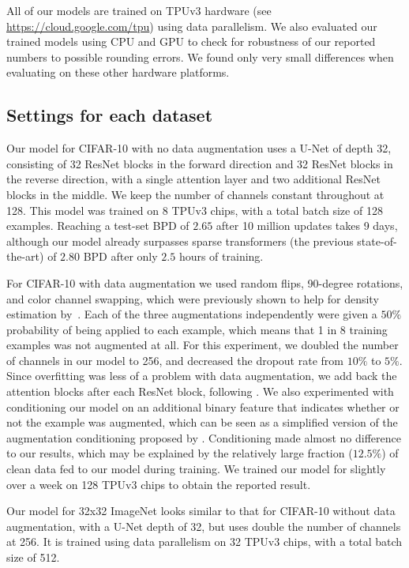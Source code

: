 \documentclass{article}
\begin{document}
All of our models are trained on TPUv3 hardware (see \url{https://cloud.google.com/tpu}) using data parallelism. We also evaluated our trained models using CPU and GPU to check for robustness of our reported numbers to possible rounding errors. We found only very small differences when evaluating on these other hardware platforms.

\subsection{Settings for each dataset}
\label{app:exp_settings}
Our model for CIFAR-10 with no data augmentation uses a U-Net of depth 32, consisting of 32 ResNet blocks in the forward direction and 32 ResNet blocks in the reverse direction, with a single attention layer and two additional ResNet blocks in the middle. We keep the number of channels constant throughout at 128. This model was trained on 8 TPUv3 chips, with a total batch size of 128 examples. Reaching a test-set BPD of $2.65$ after 10 million updates takes 9 days, although our model already surpasses sparse transformers (the previous state-of-the-art) of $2.80$ BPD after only $2.5$ hours of training.

For CIFAR-10 with data augmentation we used random flips, 90-degree rotations, and color channel swapping, which were previously shown to help for density estimation by~\cite{jun2020distribution}. Each of the three augmentations independently were given a $50\%$ probability of being applied to each example, which means that 1 in 8 training examples was not augmented at all. For this experiment, we doubled the number of channels in our model to 256, and decreased the dropout rate from $10\%$ to $5\%$. Since overfitting was less of a problem with data augmentation, we add back the attention blocks after each ResNet block, following \cite{ho2020denoising}. We also experimented with conditioning our model on an additional binary feature that indicates whether or not the example was augmented, which can be seen as a simplified version of the augmentation conditioning proposed by \cite{jun2020distribution}. Conditioning made almost no difference to our results, which may be explained by the relatively large fraction ($12.5\%$) of clean data fed to our model during training. We trained our model for slightly over a week on 128 TPUv3 chips to obtain the reported result.

Our model for 32x32 ImageNet looks similar to that for CIFAR-10 without data augmentation, with a U-Net depth of 32, but uses double the number of channels at 256. It is trained using data parallelism on 32 TPUv3 chips, with a total batch size of 512.
\end{document}
